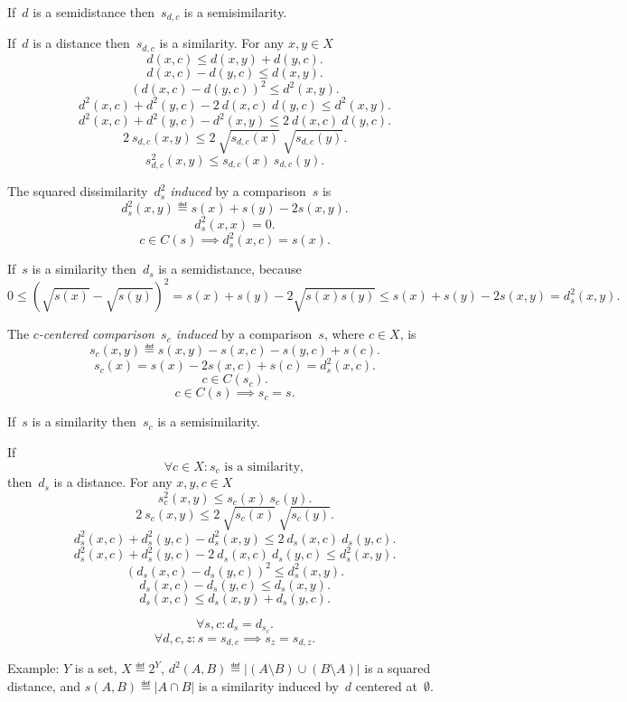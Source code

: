 \documentclass[10pt,a4paper]{article}
\theoremstyle{plain} \newtheorem{Lem}{Lemma}
\begin{document}
If~$d$ is a semidistance then~$s_{d,c}$ is a semisimilarity.

If~$d$ is a distance then~$s_{d,c}$ is a similarity.
\proof
{
    For any $x,y \in X$
    $$ d(x,c) \le d(x,y) + d(y,c). $$
    $$ d(x,c) - d(y,c) \le d(x,y). $$
    $$ \left(d(x,c) - d(y,c) \right)^2 \le d^2(x,y). $$
    $$ d^2(x,c) + d^2(y,c) - 2 \ d(x,c) \ d(y,c) \le d^2(x,y). $$
    $$ d^2(x,c) + d^2(y,c) - d^2(x,y) \le 2 \ d(x,c) \ d(y,c) . $$
    $$ 2 \ s_{d,c}(x,y) \le 2 \ \sqrt{s_{d,c}(x)} \ \sqrt{s_{d,c}(y)}. $$
    $$ s_{d,c}^2(x,y) \le s_{d,c}(x) \ s_{d,c}(y). $$
}

The squared dissimilarity~$d_s^2$ {\em induced} by a comparison~$s$ is
\begin{equation}\label{s2d}
  d_s^2(x,y) \eqdef s(x) + s(y) - 2 s(x,y).
\end{equation}
$$ d_s^2(x,x) = 0. $$
$$ c \in C(s) \implies d_s^2(x,c) = s(x). $$

If~$s$ is a similarity then~$d_s$ is a semidistance,
because
$$ 0 \le \left(\sqrt{s(x)} - \sqrt{s(y)} \right)^2 = s(x) + s(y) - 2 \sqrt{s(x) s(y)} \le s(x) + s(y) - 2 s(x,y) = d_s^2(x,y). $$

The {\em $c$-centered comparison~$s_c$ induced} by a comparison~$s$, where $c \in X$, is
$$ s_c(x,y) \eqdef s(x,y) - s(x,c) - s(y,c) + s(c). $$
$$ s_c(x) = s(x) - 2 s(x,c) + s(c) = d_s^2(x,c). $$
$$ c \in C(s_c). $$
$$ c \in C(s) \implies s_c = s. $$

If~$s$ is a similarity then~$s_c$ is a semisimilarity.

If
$$\forall c \in X : s_c \text{ is a similarity}, $$
then~$d_s$ is a distance.
\proof
{
  For any $x,y,c \in X$
  $$ s_c^2(x,y) \le s_c(x) \ s_c(y). $$
  $$ 2 \ s_c(x,y) \le 2 \ \sqrt{s_c(x)} \ \sqrt{s_c(y)}. $$
  $$ d_s^2(x,c) + d_s^2(y,c) - d_s^2(x,y) \le 2 \ d_s(x,c) \ d_s(y,c) . $$
  $$ d_s^2(x,c) + d_s^2(y,c) - 2 \ d_s(x,c) \ d_s(y,c) \le d_s^2(x,y). $$
  $$ \left(d_s(x,c) - d_s(y,c) \right)^2 \le d_s^2(x,y). $$
  $$ d_s(x,c) - d_s(y,c) \le d_s(x,y). $$
  $$ d_s(x,c) \le d_s(x,y) + d_s(y,c). $$
}


$$ \forall s, c : d_s = d_{s_c}. $$
$$ \forall d, c, z : s = s_{d,c} \implies s_z = s_{d,z} . $$

Example: $Y$ is a set, $X \eqdef 2^Y$, $d^2(A,B) \eqdef |(A \setminus B) \cup (B \setminus A)|$ is a squared distance,
and $s(A,B) \eqdef |A \cap B|$ is a similarity induced by~$d$ centered at~$\emptyset$.
\end{document}
